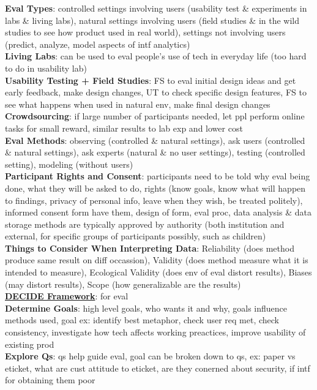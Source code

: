 \documentclass[a4paper]{article}
\begin{document}
\begin{multicols}{3}
        \textbf{Eval Types}: controlled settings involving users (usability test \& experiments in labs \& living labs), natural settings involving users (field studies \& in the wild studies to see how product used in real world), settings not involving users (predict, analyze, model aspects of intf analytics)\\
        \textbf{Living Labs}: can be used to eval people's use of tech in everyday life (too hard to do in usability lab)\\
        \textbf{Usability Testing + Field Studies}: FS to eval initial design ideas and get early feedback, make design changes, UT to check specific design features, FS to see what happens when used in natural env, make final design changes\\
        \textbf{Crowdsourcing}: if large number of participants needed, let ppl perform online tasks for small reward, similar results to lab exp and lower cost\\
        \textbf{Eval Methods}: observing (controlled \& natural settings), ask users (controlled \& natural settings), ask experts (natural \& no user settings), testing (controlled setting), modeling (without users)\\
        \textbf{Participant Rights and Consent}: participants need to be told why eval being done, what they will be asked to do, rights (know goals, know what will happen to findings, privacy of personal info, leave when they wish, be treated politely), informed consent form have them, design of form, eval proc, data analysis \& data storage methods are typically approved by authority (both institution and external, for specific groups of participants possibly, such as children)\\
        \textbf{Things to Consider When Interpreting Data}: Reliability (does method produce same result on diff occassion), Validity (does method measure what it is intended to measure), Ecological Validity (does env of eval distort results), Biases (may distort results), Scope (how generalizable are the results)\\
        \underline{\textbf{DECIDE Framework}}: for eval\\
        \textbf{Determine Goals}: high level goals, who wants it and why, goals influence methods used, goal ex: identify best metaphor, check user req met, check consistency, investigate how tech affects working preactices, improve usability of existing prod\\
        \textbf{Explore Qs}: qs help guide eval, goal can be broken down to qs, ex: paper vs eticket, what are cust attitude to eticket, are they conerned about security, if intf for obtaining them poor\\

\end{multicols}
\end{document}
